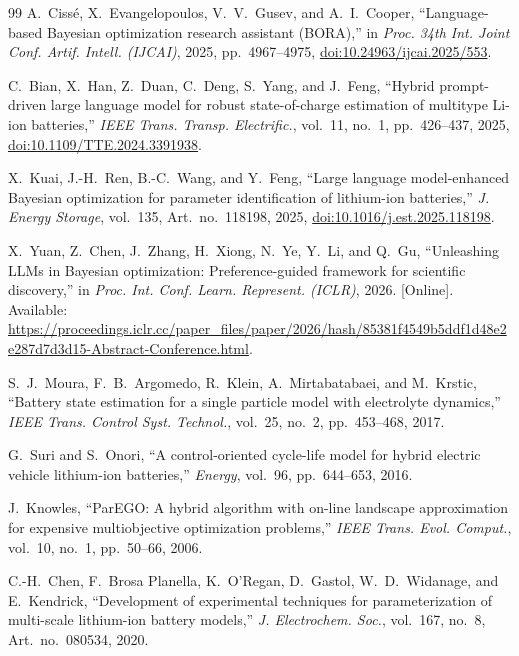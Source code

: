 \documentclass[journal]{IEEEtran}
\begin{document}
\begin{thebibliography}{99}
A.~Ciss\'e, X.~Evangelopoulos, V.~V.~Gusev,
and A.~I.~Cooper,
``Language-based Bayesian optimization research assistant (BORA),''
in \textit{Proc. 34th Int. Joint Conf. Artif. Intell. (IJCAI)},
2025, pp.~4967--4975,
\href{https://doi.org/10.24963/ijcai.2025/553}
{doi:10.24963/ijcai.2025/553}.

C.~Bian, X.~Han, Z.~Duan, C.~Deng, S.~Yang, and J.~Feng,
``Hybrid prompt-driven large language model for robust
state-of-charge estimation of multitype Li-ion batteries,''
\textit{IEEE Trans. Transp. Electrific.},
vol.~11, no.~1, pp.~426--437, 2025,
\href{https://doi.org/10.1109/TTE.2024.3391938}
{doi:10.1109/TTE.2024.3391938}.

X.~Kuai, J.-H.~Ren, B.-C.~Wang, and Y.~Feng,
``Large language model-enhanced Bayesian optimization for
parameter identification of lithium-ion batteries,''
\textit{J. Energy Storage},
vol.~135, Art.~no.~118198, 2025,
\href{https://doi.org/10.1016/j.est.2025.118198}
{doi:10.1016/j.est.2025.118198}.

X.~Yuan, Z.~Chen, J.~Zhang, H.~Xiong,
N.~Ye, Y.~Li, and Q.~Gu,
``Unleashing LLMs in Bayesian optimization:
Preference-guided framework for scientific discovery,''
in \textit{Proc. Int. Conf. Learn. Represent. (ICLR)}, 2026.
[Online]. Available:
\url{https://proceedings.iclr.cc/paper_files/paper/2026/hash/85381f4549b5ddf1d48e2e287d7d3d15-Abstract-Conference.html}.

S.~J.~Moura, F.~B.~Argomedo, R.~Klein,
A.~Mirtabatabaei, and M.~Krstic,
``Battery state estimation for a single particle model
with electrolyte dynamics,''
\textit{IEEE Trans. Control Syst. Technol.},
vol.~25, no.~2, pp.~453--468, 2017.

G.~Suri and S.~Onori,
``A control-oriented cycle-life model for hybrid electric
vehicle lithium-ion batteries,''
\textit{Energy}, vol.~96, pp.~644--653, 2016.

J.~Knowles,
``ParEGO: A hybrid algorithm with on-line landscape approximation
for expensive multiobjective optimization problems,''
\textit{IEEE Trans. Evol. Comput.},
vol.~10, no.~1, pp.~50--66, 2006.

C.-H.~Chen, F.~Brosa Planella, K.~O'Regan, D.~Gastol,
W.~D.~Widanage, and E.~Kendrick,
``Development of experimental techniques for parameterization
of multi-scale lithium-ion battery models,''
\textit{J. Electrochem. Soc.},
vol.~167, no.~8, Art.~no.~080534, 2020.


\end{thebibliography}
\end{document}
